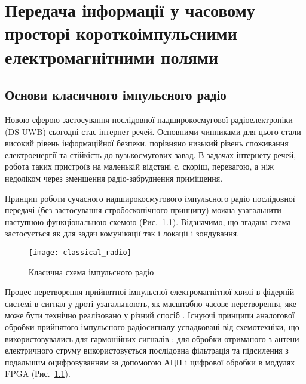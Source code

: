 \chapter{Передача інформації у часовому просторі короткоімпульсними 
електромагнітними полями}
\label{ch:neuron}

\section{Основи класичного імпульсного радіо}


Новою сферою застосування послідовної 
надширокосмугової радіоелектроніки (DS-UWB) сьогодні стає інтернет речей. 
Основними чинниками для цього стали високий рівень інформаційної безпеки, 
порівняно низький рівень споживання електроенергії та стійкість до 
вузькосмугових завад. В задачах інтернету речей, робота таких пристроїв на 
маленькій відстані є, скоріш, перевагою, а ніж недоліком через
зменшення радіо-забруднення приміщення.

Принцип роботи сучасного надширокосмугового імпульсного радіо 
послідовної передачі (без застосування стробоскопічного принципу) 
\cite{imp:ChannelImplementation} можна узагальнити наступною 
функціональною схемою (Рис.~\ref{fig:emp_radio}). Відзначимо, що згадана
схема застосується як для задач комунікації так і локації і зондування.

\begin{figure}[htbp] \begin{center}
\texttt{[image: classical\_radio]}
\caption{Класична схема імпульсного радіо} \label{fig:emp_radio}
\end{center} \end{figure}

Процес перетворення прийнятної імпульсної електромагнітної хвилі в фідерній 
системі в сигнал у дроті узагальнюють, як масштабно-часове перетворення, яке 
може бути технічно реалізовано у різний спосіб \cite{imp:Astanin1989}. 
Існуючі принципи аналогової обробки прийнятого імпульсного радіосигналу 
успадковані від схемотехніки, що використовувались для гармонійних сигналів 
\cite{imp:ComunicationsOverview}: для обробки отриманого з антени 
електричного струму використовується послідовна фільтрація та підсилення з 
подальшим оцифровуванням за допомогою АЦП і цифрової обробки в модулях 
FPGA (Рис.~\ref{fig:emp_radio}).

